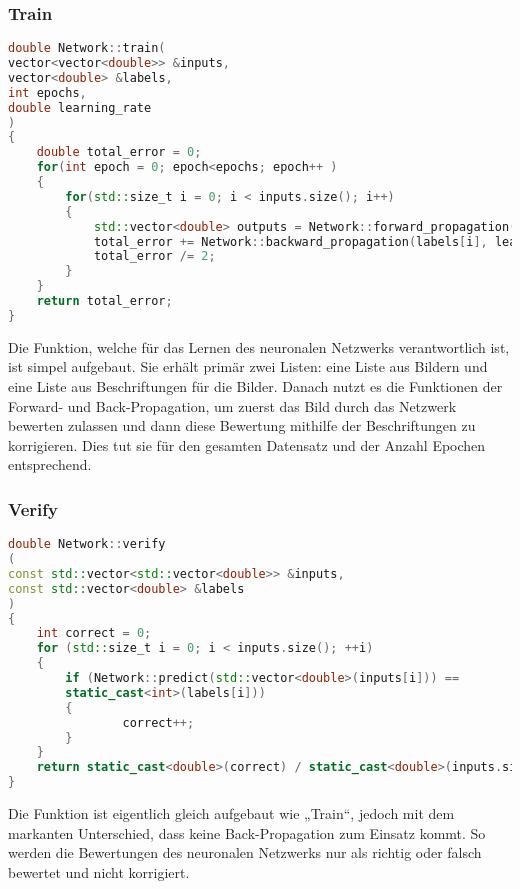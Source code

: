 \subsubsection{Train}
\label{sec:RealTrainCode}
\begin{lstlisting}[language=c++]
double Network::train(
vector<vector<double>> &inputs, 
vector<double> &labels, 
int epochs, 
double learning_rate
) 
{
	double total_error = 0;
	for(int epoch = 0; epoch<epochs; epoch++ )
	{
		for(std::size_t i = 0; i < inputs.size(); i++) 
		{
			std::vector<double> outputs = Network::forward_propagation(inputs[i]);
			total_error += Network::backward_propagation(labels[i], learning_rate);
			total_error /= 2;
		}
	}
	return total_error;
}
\end{lstlisting}
Die Funktion, welche für das Lernen des neuronalen Netzwerks verantwortlich ist, ist simpel aufgebaut. Sie erhält primär zwei Listen: eine Liste aus Bildern und eine Liste aus Beschriftungen für die Bilder. Danach nutzt es die Funktionen der Forward- und Back-Propagation, um zuerst das Bild durch das Netzwerk bewerten zulassen und dann diese Bewertung mithilfe der Beschriftungen zu korrigieren. Dies tut sie für den gesamten Datensatz und der Anzahl Epochen entsprechend.

\subsubsection{Verify}
\label{sec:RealVerifyCode}
\begin{lstlisting}[language=c++]
double Network::verify
(
const std::vector<std::vector<double>> &inputs, 
const std::vector<double> &labels
) 
{
	int correct = 0;
	for (std::size_t i = 0; i < inputs.size(); ++i) 
	{
		if (Network::predict(std::vector<double>(inputs[i])) == 
		static_cast<int>(labels[i])) 
		{
				correct++;
		}
	}
	return static_cast<double>(correct) / static_cast<double>(inputs.size());
}
\end{lstlisting}
Die Funktion ist eigentlich gleich aufgebaut wie „Train“, jedoch mit dem markanten Unterschied, dass keine Back-Propagation zum Einsatz kommt. So werden die Bewertungen des neuronalen Netzwerks nur als richtig oder falsch bewertet und nicht korrigiert.

